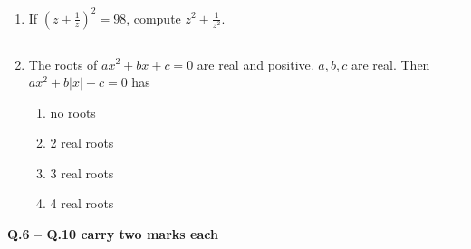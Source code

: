 \documentclass[journal,12pt,onecolumn]{IEEEtran}
\begin{document}
\begin{enumerate}[label=Q\arabic*:, leftmargin=*, itemindent=0pt]
\item If $(z + \frac{1}{z})^2 = 98$, compute $z^2 + \frac{1}{z^2}$.

\rule{4cm}{0.15mm}

\item The roots of $a x^2 + b x + c = 0$ are real and positive. $a, b, c$ are real. Then $a x^2 + b |x| + c = 0$ has

\begin{enumerate}[label=(\Alph*), nosep]
\item no roots
\item 2 real roots
\item 3 real roots
\item 4 real roots
\end{enumerate}

\end{enumerate}

\vspace{1cm}

\textbf{Q.6 -- Q.10 carry two marks each}
\end{document}
